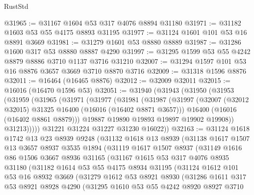 \begin{lexlean}{RustStd}
\begin{coremodule}
@31965 := @31167 @1604 @53 @317 @4076 @8894 @31180
@31971 := @31182 @1603 @53 @55 @4175 @8893 @31195
@31977 := @31124 @1601 @101 @53 @16 @8891 @3669
@31981 := @31279 @1601 @53 @8880 @8889
@31987 := @31286 @1600 @317 @53 @8880 @8887 @4290
@31997 := @31295 @1599 @53 @55 @4242 @8879 @8886 @3710 @1137 @3716 @31210
@32007 := @31294 @1597 @101 @53 @16 @8876 @3657 @3669 @3710 @8870 @3716
@32009 := @31318 @1596 @8876
@32011 := @16464 (@16465 @8876)
@32012 := @32009 @32011
@32015 := @16016 (@16470 @1596 @53)
@32051 := @31940
    (@31943
      (@31950
        (@31953
          (@31959
            (@31965
              (@31971
                (@31977
                  (@31981
                    (@31987
                      (@31997
                        (@32007 (@32012 @32015) @31325 @16400 (@16016 (@16402 @8871 @3657)))
                        @16400
                        (@16016 (@16402 @8861 @8879)))
                      @19887
                      @19890
                      @19893
                      @19897
                      @19902
                      @19908))
                  @31213)))))
        @31221
        @31224
        @31227
        @31230
        @16022))
@32163 := @31124
    @1618
    @1742
    @13
    @23
    @8939
    @9248
    (@31132
      @1618
      @13
      @8939
      (@31138
        @1617
        @1507
        @13
        @3657
        @8937
        @3535
        @1894
        (@31119
          @1617
          @1507
          @8937
          (@31149
            @1616
            @86
            @1506
            @3667
            @8936
            @31165
            (@31167
              @1615
              @53
              @317
              @4076
              @8935
              @31180
              (@31182
                @1614
                @53
                @55
                @4175
                @8934
                @31195
                (@31124
                  @1612
                  @101
                  @53
                  @16
                  @8932
                  @3669
                  (@31279
                    @1612
                    @53
                    @8921
                    @8930
                    (@31286
                      @1611
                      @317
                      @53
                      @8921
                      @8928
                      @4290
                      (@31295
                        @1610
                        @53
                        @55
                        @4242
                        @8920
                        @8927
                        @3710

\end{coremodule}
\end{lexlean}
